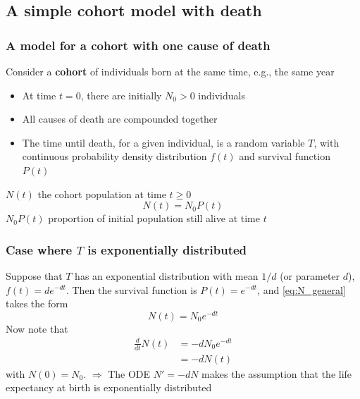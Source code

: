 \documentclass[aspectratio=169]{beamer}
\begin{document}
\subsection{A simple cohort model with death} 

\begin{frame}\frametitle{A model for a cohort with one cause of death}
Consider a \textbf{cohort} of individuals born at the same time, e.g., the same year
\vfill
\begin{itemize}
\item At time $t=0$, there are initially $N_0>0$ individuals
\item All causes of death are compounded together 
\item The time until death, for a given individual, is a random variable $T$, with continuous probability density distribution $f(t)$ and survival function $P(t)$
\end{itemize}
\vfill
$N(t)$ the cohort population at time $t\geq 0$
\begin{equation}\label{eq:N_general}
N(t)=N_0P(t)
\end{equation}
\vfill
$N_0P(t)$ proportion of initial population still alive at time $t$
\end{frame}

\begin{frame}\frametitle{Case where $T$ is exponentially distributed}
Suppose that $T$ has an exponential distribution with mean $1/d$ (or parameter $d$), $f(t)=de^{-dt}$. Then the survival function is $P(t)=e^{-dt}$, and \eqref{eq:N_general} takes the form
\begin{equation}\label{eq:N}
N(t)=N_0e^{-dt}
\end{equation}
\vfill
Now note that
\begin{align*}
\frac{d}{dt} N(t) &= -dN_0e^{-dt} \\
&= -dN(t)
\end{align*}
with $N(0)=N_0$.
\vfill
{\red $\Rightarrow$} The ODE $N'=-dN$ makes the assumption that the life expectancy at birth is exponentially distributed
\end{frame}
\end{document}
